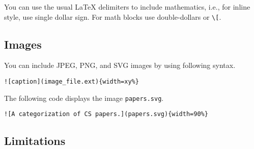 You can use the usual LaTeX delimiters to include mathematics, i.e., for inline style, use single dollar sign.
%
For math blocks use double-dollars or \lstinline`\[`.

\subsection{Images}

\begin{flex}
\begin{gram}
You can include JPEG, PNG, and SVG images by using following syntax.
\begin{lstlisting}
![caption](image_file.ext){width=xy%}
\end{lstlisting}
\end{gram}

\begin{example}
The following code displays the image \lstinline`papers.svg`.
\begin{lstlisting}
![A categorization of CS papers.](papers.svg){width=90%}
\end{lstlisting}
\end{example}
\end{flex}

\subsection{Limitations}

